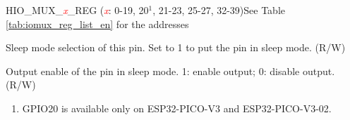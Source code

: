 \begin{register}{H}{IO\_MUX\_\textcolor{red}{\it{x}}\_REG (\textcolor{red}{\it{x}}: 0-19, 20$^1$, 21-23, 25-27, 32-39)}{See Table \ref{tab:iomux_reg_list_en} for the addresses}
\begin{regdesc}
\begin{reglist}
\item [SLP\_SEL]Sleep mode selection of this pin. Set to 1 to put the pin in sleep mode. (R/W)
\item [MCU\_OE]Output enable of the pin in sleep mode. 1: enable output; 0: disable output. (R/W)
\end{reglist}\end{regdesc}
\begin{tiplisting}
\vspace{-1em}
\begin{enumerate}
  \vspace{-1em}
  \item GPIO20 is available only on ESP32-PICO-V3 and ESP32-PICO-V3-02.
\end{enumerate}
\end{tiplisting}
\end{register}

